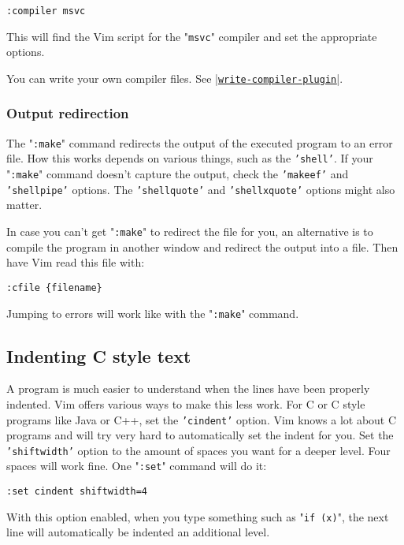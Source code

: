\begin{Verbatim}[samepage=true]
 :compiler msvc
\end{Verbatim}

This will find the Vim script for the "\texttt{msvc}" compiler and set the appropriate options.

You can write your own compiler files.  See \hyperref[write-compiler-plugin]{|\texttt{write-compiler-plugin}|}.

\subsubsection{Output redirection}
The "\texttt{:make}" command redirects the output of the executed program to an error file.
How this works depends on various things, such as the \texttt{'shell'}.
If your "\texttt{:make}" command doesn't capture the output, check the \texttt{'makeef'} and \texttt{'shellpipe'} options.
The \texttt{'shellquote'} and \texttt{'shellxquote'} options might also matter.

In case you can't get "\texttt{:make}" to redirect the file for you, an alternative is to compile the program in another window and redirect the output into a file.
Then have Vim read this file with:

\begin{Verbatim}[samepage=true]
 :cfile {filename}
\end{Verbatim}

Jumping to errors will work like with the "\texttt{:make}" command.
\subsection{Indenting C style text}
A program is much easier to understand when the lines have been properly indented.
Vim offers various ways to make this less work.
For C or C style programs like Java or C++, set the \texttt{'cindent'} option.
Vim knows a lot about C programs and will try very hard to automatically set the indent for you.
Set the \texttt{'shiftwidth'} option to the amount of spaces you want for a deeper level.
Four spaces will work fine.
One "\texttt{:set}" command will do it:

\begin{Verbatim}[samepage=true]
 :set cindent shiftwidth=4
\end{Verbatim}

With this option enabled, when you type something such as "\texttt{if (x)}", the next line will automatically be indented an additional level.

